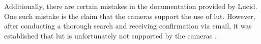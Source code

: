 Additionally, there are certain mistakes in the documentation provided by Lucid. One such mistake is the claim that the cameras support the use of \gls{lut}. However, after conducting a thorough search and receiving confirmation via email, it was established that \gls{lut} is unfortunately not supported by the cameras \cite{fischerRe15406LUT2022} \cite{lucidvisionlabsTritonMPPolarized2020}.
